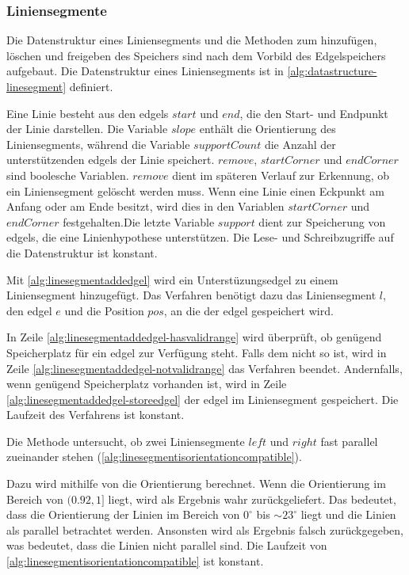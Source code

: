 \subsubsection{Liniensegmente} %
\label{sub:datenstruktur-liniensegmente}

Die Datenstruktur eines Liniensegments und die Methoden zum hinzufügen, löschen und freigeben des Speichers sind nach
 dem Vorbild des Edgelspeichers aufgebaut. Die Datenstruktur eines Liniensegments ist in
 \autoref{alg:datastructure-linesegment} definiert.

Eine Linie besteht aus den \glspl{edgel} $\mathit{start}$ und $\mathit{end}$, die den Start- und Endpunkt der Linie
 darstellen. Die Variable $\mathit{slope}$ enthält die Orientierung des Liniensegments, während die Variable
 $\mathit{supportCount}$ die Anzahl der unterstützenden \glspl{edgel} der Linie speichert. $\mathit{remove}$,
 $\mathit{startCorner}$ und $\mathit{endCorner}$ sind boolesche Variablen. $\mathit{remove}$ dient im späteren Verlauf
 zur Erkennung, ob ein Liniensegment gelöscht werden muss. Wenn eine Linie einen Eckpunkt am Anfang oder am Ende
 besitzt, wird dies in den Variablen $\mathit{startCorner}$ und $\mathit{endCorner}$ festgehalten.Die letzte Variable
 $\mathit{support}$ dient zur Speicherung von \glspl{edgel}, die eine Linienhypothese unterstützen. Die Lese- und
 Schreibzugriffe auf die Datenstruktur ist konstant.

Mit \autoref{alg:linesegmentaddedgel} wird ein Unterstüzungsedgel zu einem Liniensegment hinzugefügt. Das Verfahren
 benötigt dazu das Liniensegment $l$, den \gls{edgel} $e$ und die Position $\mathit{pos}$, an die der \gls{edgel}
 gespeichert wird.

In Zeile \ref{alg:linesegmentaddedgel-hasvalidrange} wird überprüft, ob genügend Speicherplatz für ein \gls{edgel} zur
 Verfügung steht. Falls dem nicht so ist, wird in Zeile \ref{alg:linesegmentaddedgel-notvalidrange} das Verfahren
 beendet. Andernfalls, wenn genügend Speicherplatz vorhanden ist, wird in Zeile
 \ref{alg:linesegmentaddedgel-storeedgel} der \gls{edgel} im Liniensegment gespeichert. Die Laufzeit des Verfahrens ist
 konstant.

Die Methode  untersucht, ob zwei Liniensegmente $\mathit{left}$ und $\mathit{right}$
 fast parallel zueinander stehen (\autoref{alg:linesegmentisorientationcompatible}).

Dazu wird mithilfe von  die Orientierung berechnet. Wenn die Orientierung im Bereich von
 $(0.92,1]$ liegt, wird als Ergebnis wahr zurückgeliefert. Das bedeutet, dass die Orientierung der Linien im Bereich
 von $0^\circ$ bis $\sim 23^\circ$ liegt und die Linien als parallel betrachtet werden. Ansonsten wird als Ergebnis
 falsch zurückgegeben, was bedeutet, dass die Linien nicht parallel sind. Die Laufzeit von
 \autoref{alg:linesegmentisorientationcompatible} ist konstant.

